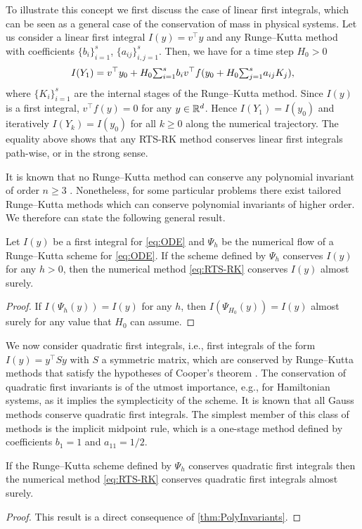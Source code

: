 \documentclass[10pt]{article}
\begin{document}
\begin{example} To illustrate this concept we first discuss the case of linear first integrals, which can be seen as a general case of the conservation of mass in physical systems. Let us consider a linear first integral $I(y) = v^\top y$ and any Runge--Kutta method with coefficients $\{b_i\}_{i=1}^s$, $\{a_{ij}\}_{i,j=1}^s$. Then, we have for a time step $H_0 > 0$
	\begin{equation}
		I(Y_1) = v^\top y_0 + H_0 {\textstyle\sum}_{i=1}^s b_iv^\top f(y_0 + H_0{\textstyle\sum}_{j=1}^{s} a_{ij}K_j),
	\end{equation}
	where $\{K_i\}_{i=1}^s$ are the internal stages of the Runge--Kutta method. Since $I(y)$ is a first integral, $v^\top f(y) = 0$ for any $y \in \mathbb{R}^d$. Hence $I(Y_1)  = I(y_0)$ and iteratively $I(Y_k) = I(y_0)$ for all $k \geq 0$ along the numerical trajectory. The equality above shows that any RTS-RK method conserves linear first integrals path-wise, or in the strong sense. 
\end{example}

It is known that no Runge--Kutta method can conserve any polynomial invariant of order $n \geq 3$ \cite[Theorem IV.3.3]{HLW06}. Nonetheless, for some particular problems there exist tailored Runge--Kutta methods which can conserve polynomial invariants of higher order. We therefore can state the following general result.
\begin{theorem}\label{thm:PolyInvariants} Let $I(y)$ be a first integral for \eqref{eq:ODE} and $\Psi_h$ be the numerical flow of a Runge--Kutta scheme for \eqref{eq:ODE}. If the scheme defined by $\Psi_h$ conserves $I(y)$ for any $h > 0$, then the numerical method \eqref{eq:RTS-RK} conserves $I(y)$ almost surely.
\end{theorem}
\begin{proof} If $I(\Psi_h(y)) = I(y)$ for any $h$, then $I(\Psi_{H_0}(y)) = I(y)$ almost surely for any value that $H_0$ can assume.
\end{proof}

We now consider quadratic first integrals, i.e., first integrals of the form $I(y) = y^\top S y$ with $S$ a symmetric matrix, which are conserved by Runge--Kutta methods that satisfy the hypotheses of Cooper's theorem \cite[Theorem IV.2.2]{HLW06}. The conservation of quadratic first invariants is of the utmost importance, e.g., for Hamiltonian systems, as it implies the symplecticity of the scheme. It is known \cite[Theorem IV.2.1]{HLW06} that all Gauss methods conserve quadratic first integrals. The simplest member of this class of methods is the implicit midpoint rule, which is a one-stage method defined by coefficients $b_1 = 1$ and $a_{11} = 1/2$.
\begin{corollary}\label{thm:QuadraticInvariants} If the Runge--Kutta scheme defined by $\Psi_h$ conserves quadratic first integrals then the numerical method \eqref{eq:RTS-RK} conserves quadratic first integrals almost surely.
\end{corollary}
\begin{proof} This result is a direct consequence of \cref{thm:PolyInvariants}. \end{proof}
\end{document}
